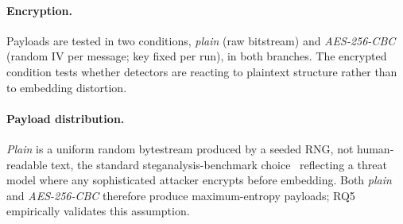 \documentclass[10pt,twocolumn,a4paper]{article}
\begin{document}
\paragraph{Encryption.} Payloads are tested in two conditions, \emph{plain} (raw bitstream) and \emph{AES-256-CBC} (random IV per message; key fixed per run), in both branches. The encrypted condition tests whether detectors are reacting to plaintext structure rather than to embedding distortion.

\paragraph{Payload distribution.} \emph{Plain} is a uniform random bytestream produced by a seeded RNG, not human-readable text, the standard steganalysis-benchmark choice~\cite{boroumand2019srnet,holub2015dctr} reflecting a threat model where any sophisticated attacker encrypts before embedding. Both \emph{plain} and \emph{AES-256-CBC} therefore produce maximum-entropy payloads; RQ5 empirically validates this assumption.
\end{document}
